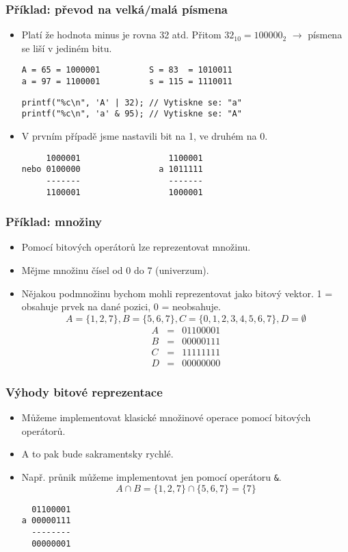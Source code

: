 \documentclass{beamer}
\newenvironment{itemizex}%
  {\large \begin{itemize}%
    \setlength{\itemsep}{8pt}%
    \setlength{\parskip}{8pt}}%
  {\end{itemize}}
\newenvironment{itemizey}%
  {\large \begin{itemize}%
    \setlength{\itemsep}{6pt}%
    \setlength{\parskip}{6pt}}%
  {\end{itemize}}
\begin{document}
\begin{frame}[t,fragile]\frametitle{Příklad: převod na velká/malá písmena} 
    \begin{itemizex}
        \item Platí že hodnota  minus  je rovna 32 atd. Přitom $32_{10}=100000_2$ $\rightarrow$ písmena se liší v jediném bitu.
\begin{verbatim}
A = 65 = 1000001          S = 83  = 1010011
a = 97 = 1100001          s = 115 = 1110011
\end{verbatim}
\begin{verbatim} 
printf("%c\n", 'A' | 32); // Vytiskne se: "a"
printf("%c\n", 'a' & 95); // Vytiskne se: "A"
\end{verbatim}
    \item V prvním případě jsme nastavili bit na 1, ve druhém na 0.
\begin{verbatim}
     1000001                  1100001
nebo 0100000                a 1011111
     -------                  -------
     1100001                  1000001
\end{verbatim}
    \end{itemizex}
\end{frame}


\begin{frame}[t,fragile]\frametitle{Příklad: množiny} 
    \begin{itemizey}
        \item Pomocí bitových operátorů lze reprezentovat množinu.
        \item Mějme množinu čísel od 0 do 7 (univerzum).
        \item Nějakou podmnožinu bychom mohli reprezentovat jako bitový vektor. 1 = obsahuje prvek na dané pozici, 0 = neobsahuje. 
$$
A=\{1,2,7\}, B = \{5,6,7\}, C=\{0,1,2,3,4,5,6,7\}, D = \emptyset
$$
\begin{eqnarray*}
A &=& 01100001\\
B &=& 00000111\\
C &=& 11111111\\
D &=& 00000000
\end{eqnarray*}
    \end{itemizey}
\end{frame}


\begin{frame}[t,fragile]\frametitle{Výhody bitové reprezentace} 
    \begin{itemizex}
        \item Můžeme implementovat klasické množinové operace pomocí bitových operátorů.
        \item A to pak bude sakramentsky rychlé.
        \item Např. průnik můžeme implementovat jen pomocí operátoru \texttt{\&}. 
$$
A \cap B = \{1,2,7\} \cap \{5,6,7\} = \{7\}
$$

\begin{verbatim}
  01100001
a 00000111
  --------
  00000001
\end{verbatim}
    \end{itemizex}
\end{frame}
\end{document}
